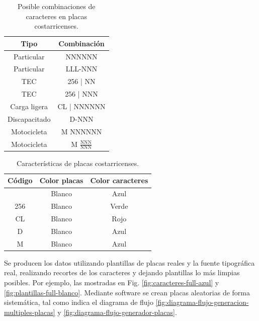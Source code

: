 \begin{table}[H]
	\centering
	\begin{tabular}{|c|c|}
		\hline
			Tipo & Combinación \\
		\hline
			Particular & NNNNNN \\
		\hline
			Particular & LLL-NNN \\
		\hline
			TEC & 256 | NN \\
		\hline
			TEC & 256 | NNN \\
		\hline
			Carga ligera & CL | NNNNNN \\
		\hline
			Discapacitado & D-NNN \\
		\hline
			Motocicleta & M NNNNNN \\
		\hline
			Motocicleta & M $\frac{\text{NNN}}{\text{NNN}}$ \\
		\hline
	\end{tabular}
	\caption{Posible combinaciones de caracteres en placas costarricenses.}
	\label{tab:combinaciones-placas}
\end{table}

\begin{table}[H]
	\centering
	\begin{tabular}{|c|c|c|}
		\hline
			Código & Color placas & Color caracteres \\
		\hline
			 & Blanco & Azul \\
		\hline
			256 & Blanco & Verde \\
		\hline
			CL & Blanco & Rojo \\
		\hline
			 D & Blanco & Azul \\
		\hline
			 M & Blanco & Azul \\
		\hline
	\end{tabular}
	\caption{Características de placas costarricenses.}
	\label{tab:caracteristicas-placas}
\end{table}

Se producen los datos utilizando plantillas de placas reales y la fuente tipográfica real,
realizando recortes de los caracteres y dejando plantillas lo más limpias posibles.
Por ejemplo, las mostradas en Fig. \ref{fig:caracteres-full-azul} y \ref{fig:plantillas-full-blanco}.
Mediante software se crean placas aleatorias de forma sistemática,
tal como indica el diagrama de flujo \ref{fig:diagrama-flujo-generacion-multiples-placas}
y \ref{fig:diagrama-flujo-generador-placas}. 

